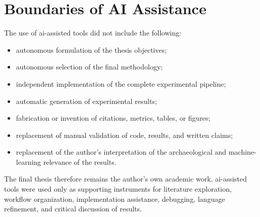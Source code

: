 \section{Boundaries of AI Assistance}

The use of \gls{ai}-assisted tools did not include the following:

\begin{itemize}
    \item autonomous formulation of the thesis objectives;
    \item autonomous selection of the final methodology;
    \item independent implementation of the complete experimental pipeline;
    \item automatic generation of experimental results;
    \item fabrication or invention of citations, metrics, tables, or figures;
    \item replacement of manual validation of code, results, and written claims;
    \item replacement of the author's interpretation of the archaeological and machine-learning relevance of the results.
\end{itemize}

The final thesis therefore remains the author's own academic work. \gls{ai}-assisted tools were used only as supporting instruments for literature exploration, workflow organization, implementation assistance, debugging, language refinement, and critical discussion of results.
